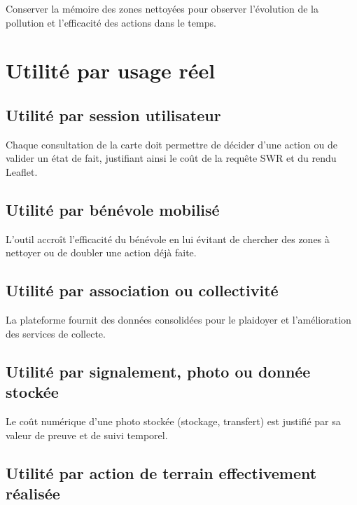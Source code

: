 \documentclass[
  10pt,
  a4paper,
  DIV=11,
  numbers=noendperiod,
  oneside]{scrreprt}
\begin{document}
Conserver la mémoire des zones nettoyées pour observer l'évolution de la
pollution et l'efficacité des actions dans le temps.

\section{Utilité par usage réel}\label{utilituxe9-par-usage-ruxe9el}

\subsection{Utilité par session
utilisateur}\label{utilituxe9-par-session-utilisateur}

Chaque consultation de la carte doit permettre de décider d'une action
ou de valider un état de fait, justifiant ainsi le coût de la requête
SWR et du rendu Leaflet.

\subsection{Utilité par bénévole
mobilisé}\label{utilituxe9-par-buxe9nuxe9vole-mobilisuxe9}

L'outil accroît l'efficacité du bénévole en lui évitant de chercher des
zones à nettoyer ou de doubler une action déjà faite.

\subsection{Utilité par association ou
collectivité}\label{utilituxe9-par-association-ou-collectivituxe9}

La plateforme fournit des données consolidées pour le plaidoyer et
l'amélioration des services de collecte.

\subsection{Utilité par signalement, photo ou donnée
stockée}\label{utilituxe9-par-signalement-photo-ou-donnuxe9e-stockuxe9e}

Le coût numérique d'une photo stockée (stockage, transfert) est justifié
par sa valeur de preuve et de suivi temporel.

\subsection{Utilité par action de terrain effectivement
réalisée}\label{utilituxe9-par-action-de-terrain-effectivement-ruxe9alisuxe9e}
\end{document}
